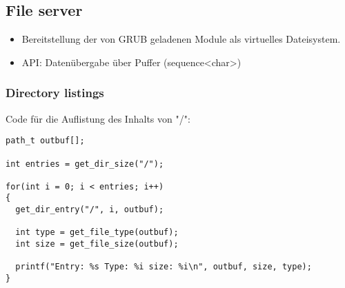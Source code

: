 \subsection{File server}





\begin{itemize}
	\item Bereitstellung der von GRUB geladenen Module als virtuelles Dateisystem.
	
	\item API: Datenübergabe über Puffer (sequence<char>)

\end{itemize}

\subsubsection{Directory listings}

Code für die Auflistung des Inhalts von "/":

\begin{lstlisting}
path_t outbuf[];

int entries = get_dir_size("/");

for(int i = 0; i < entries; i++)
{
  get_dir_entry("/", i, outbuf);
  
  int type = get_file_type(outbuf);
  int size = get_file_size(outbuf);
  
  printf("Entry: %s Type: %i size: %i\n", outbuf, size, type);
}
\end{lstlisting}

